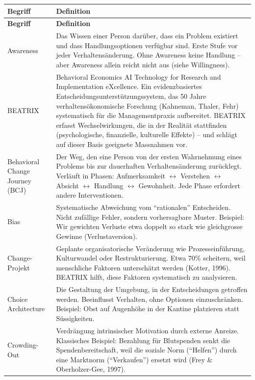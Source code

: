 \documentclass[11pt,a4paper]{article}
\begin{document}
\begin{longtable}{@{}L{4cm}L{10cm}@{}}
\toprule
\textbf{Begriff} & \textbf{Definition} \\
\midrule
\endfirsthead
\toprule
\textbf{Begriff} & \textbf{Definition} \\
\midrule
\endhead

Awareness & Das Wissen einer Person darüber, dass ein Problem existiert und dass Handlungsoptionen verfügbar sind. Erste Stufe vor jeder Verhaltensänderung. Ohne Awareness keine Handlung -- aber Awareness allein reicht nicht aus (siehe Willingness). \\
\midrule
BEATRIX & Behavioral Economics AI Technology for Research and Implementation eXcellence. Ein evidenzbasiertes Entscheidungsunterstützungssystem, das 50 Jahre verhaltensökonomische Forschung (Kahneman, Thaler, Fehr) systematisch für die Managementpraxis aufbereitet. BEATRIX erfasst Wechselwirkungen, die in der Realität stattfinden (psychologische, finanzielle, kulturelle Effekte) -- und schlägt auf dieser Basis geeignete Massnahmen vor. \\
\midrule
Behavioral Change Journey (BCJ) & Der Weg, den eine Person von der ersten Wahrnehmung eines Problems bis zur dauerhaften Verhaltensänderung zurücklegt. Verläuft in Phasen: Aufmerksamkeit $\leftrightarrow$ Verstehen $\leftrightarrow$ Absicht $\leftrightarrow$ Handlung $\leftrightarrow$ Gewohnheit. Jede Phase erfordert andere Interventionen. \\
\midrule
Bias & Systematische Abweichung vom ``rationalen'' Entscheiden. Nicht zufällige Fehler, sondern vorhersagbare Muster. Beispiel: Wir gewichten Verluste etwa doppelt so stark wie gleichgrosse Gewinne (Verlustaversion). \\
\midrule
Change-Projekt & Geplante organisatorische Veränderung wie Prozesseinführung, Kulturwandel oder Restrukturierung. Etwa 70\% scheitern, weil menschliche Faktoren unterschätzt werden (Kotter, 1996). BEATRIX hilft, diese Faktoren systematisch zu analysieren. \\
\midrule
Choice Architecture & Die Gestaltung der Umgebung, in der Entscheidungen getroffen werden. Beeinflusst Verhalten, ohne Optionen einzuschränken. Beispiel: Obst auf Augenhöhe in der Kantine platzieren statt Süssigkeiten. \\
\midrule
Crowding-Out & Verdrängung intrinsischer Motivation durch externe Anreize. Klassisches Beispiel: Bezahlung für Blutspenden senkt die Spendenbereitschaft, weil die soziale Norm (``Helfen'') durch eine Marktnorm (``Verkaufen'') ersetzt wird (Frey \& Oberholzer-Gee, 1997). \\

\end{longtable}
\end{document}
